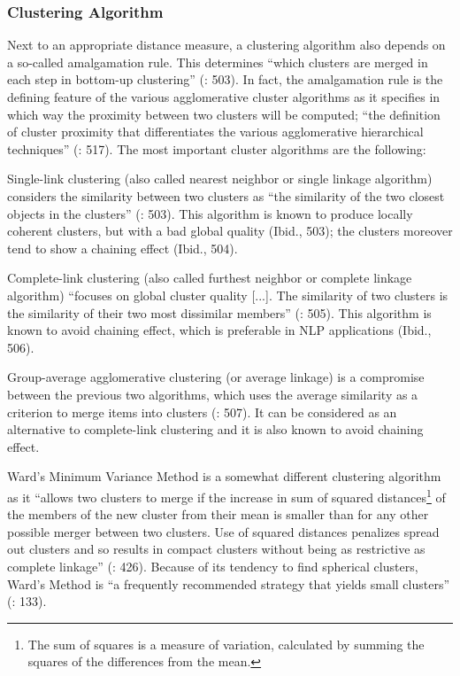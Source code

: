\subsubsection{\label{sec:3.7.2.2}  Clustering Algorithm}

Next to an appropriate distance measure, a clustering algorithm also depends on a so-called amalgamation rule. This determines “which clusters are merged in each step in bottom-up clustering” (\citealt{manning_foundations_1999}: 503). In fact, the amalgamation rule is the defining feature of the various agglomerative cluster algorithms as it specifies in which way the proximity between two clusters will be computed; “the definition of cluster proximity that differentiates the various agglomerative hierarchical techniques” (\citealt{tan_introduction_2006}: 517). The most important cluster algorithms are the following:



Single-link clustering (also called nearest neighbor or single linkage algorithm) considers the similarity between two clusters as “the similarity of the two closest objects in the clusters” (\citealt{manning_foundations_1999}: 503). This algorithm is known to produce locally coherent clusters, but with a bad global quality (Ibid., 503); the clusters moreover tend to show a chaining effect (Ibid., 504).



Complete-link clustering (also called furthest neighbor or complete linkage algorithm) “focuses on global cluster quality [...]. The similarity of two clusters is the similarity of their two most dissimilar members” (\citealt{manning_foundations_1999}: 505). This algorithm is known to avoid chaining effect, which is preferable in NLP applications (Ibid., 506).



Group-average agglomerative clustering (or average linkage) is a compromise between the previous two algorithms, which uses the average similarity as a criterion to merge items into clusters (\citealt{manning_foundations_1999}: 507). It can be considered as an alternative to complete-link clustering and it is also known to avoid chaining effect.



Ward’s Minimum Variance Method is a somewhat different clustering algorithm as it “allows two clusters to merge if the increase in sum of squared distances\footnote{The sum of squares is a measure of variation, calculated by summing the squares of the differences from the mean.} of the members of the new cluster from their mean is smaller than for any other possible merger between two clusters. Use of squared distances penalizes spread out clusters and so results in compact clusters without being as restrictive as complete linkage” (\citealt{glynn_cluster_2014}: 426). Because of its tendency to find spherical clusters, Ward’s Method is “a frequently recommended strategy that yields small clusters” (\citealt{divjak_structuring_2010}: 133).



